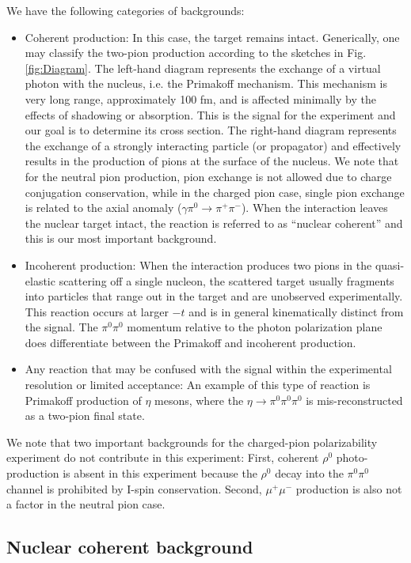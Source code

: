 We have the following categories of backgrounds:
\begin{itemize}
\item Coherent production: In this case, the target remains intact. Generically, one may classify the two-pion production
according to the sketches in Fig.\,\ref{fig:Diagram}. The left-hand diagram represents the exchange of a virtual photon with the nucleus, i.e. the Primakoff
mechanism. This mechanism is very long range, approximately 100 fm, and is affected minimally by the effects of shadowing or absorption.  This is the signal for the
experiment and our goal is to determine its cross section.
The right-hand diagram represents the exchange of a strongly interacting particle (or propagator) and effectively results in the production of pions at the
surface of the nucleus. We note that for the neutral pion production, pion exchange is not allowed due to charge conjugation conservation, while 
in the charged pion case, single pion exchange is related to the axial anomaly ($\gamma \pi^0 \rightarrow \pi^+ \pi^-$).  When the interaction leaves the
nuclear target intact, the reaction is referred to as ``nuclear coherent'' and this is our most important background. 
\item Incoherent production:  When the interaction produces two pions in the quasi-elastic scattering off a single
nucleon, the scattered target usually fragments into particles that range out in the target and are unobserved experimentally. This reaction occurs at larger $-t$ and is in general
kinematically distinct from the signal. The $\pi^0\pi^0$ momentum relative to the photon polarization plane does differentiate between the Primakoff and incoherent production.
\item Any reaction that may be confused with the signal within the experimental resolution or limited acceptance:
 An example of this type of reaction is Primakoff production of $\eta$ mesons, where the $\eta\rightarrow \pi^0 \pi^0 \pi^0$  is
mis-reconstructed as a two-pion final state. 
\end{itemize}

We note that two important backgrounds for the charged-pion polarizability experiment do not contribute in this experiment:
First, coherent $\rho^0$ photo-production is absent in this
experiment because the $\rho^0$ decay into the $\pi^0\pi^0$ channel is prohibited by I-spin conservation.  Second, $\mu^+\mu^-$ production is also not a factor in the neutral pion case.

\subsection{Nuclear coherent background \label{sec:NCback}}
   
